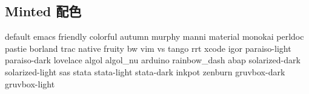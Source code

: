 \documentclass{mynote}
\begin{document}
\subsection{Minted 配色}

\begin{BashCode}
default
emacs
friendly
colorful
autumn
murphy
manni
material
monokai
perldoc
pastie
borland
trac
native
fruity
bw
vim
vs
tango
rrt
xcode
igor
paraiso-light
paraiso-dark
lovelace
algol
algol_nu
arduino
rainbow_dash
abap
solarized-dark
solarized-light
sas
stata
stata-light
stata-dark
inkpot
zenburn
gruvbox-dark
gruvbox-light
\end{BashCode}
\end{document}
